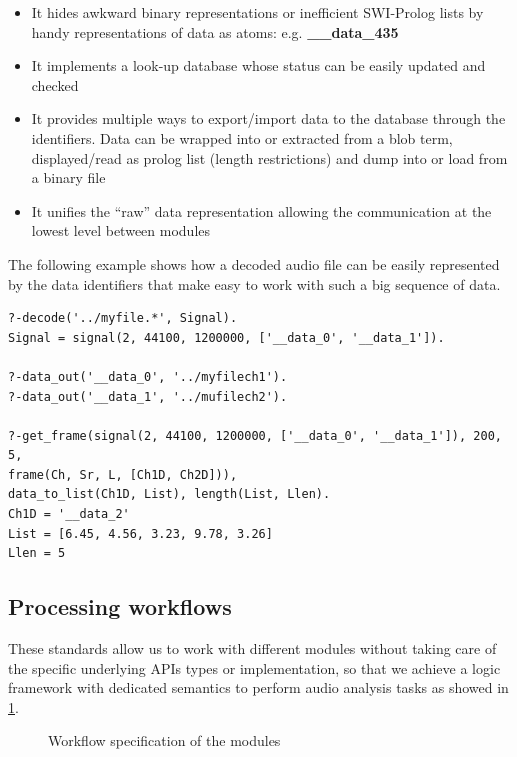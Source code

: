 \documentclass[runningheads]{llncs}
\begin{document}
\begin{itemize}
 \item It hides awkward binary representations or inefficient SWI-Prolog lists by handy representations of data as atoms: e.g. \textbf{\_\_data\_435}
 \item It implements a look-up database whose status can be easily updated and checked
 \item It provides multiple ways to export/import data to the database through the identifiers. Data can be wrapped into or extracted from a blob term, displayed/read as prolog list (length restrictions) and dump into or load from a binary file
 \item It unifies the ``raw'' data representation allowing the communication at the lowest level between modules 
\end{itemize}

The following example shows how a decoded audio file can be easily represented by the data identifiers that make easy to work with such a big sequence of data.
\begin{verbatim}
?-decode('../myfile.*', Signal).
Signal = signal(2, 44100, 1200000, ['__data_0', '__data_1']).

?-data_out('__data_0', '../myfilech1').
?-data_out('__data_1', '../mufilech2').

?-get_frame(signal(2, 44100, 1200000, ['__data_0', '__data_1']), 200, 5,
frame(Ch, Sr, L, [Ch1D, Ch2D])),
data_to_list(Ch1D, List), length(List, Llen).
Ch1D = '__data_2'
List = [6.45, 4.56, 3.23, 9.78, 3.26]
Llen = 5
\end{verbatim}

\subsection{Processing workflows}\label{subsec:worflow}

These standards allow us to work with different modules without taking care of the specific underlying APIs types or implementation, so that we achieve a logic framework with dedicated semantics to perform audio analysis tasks as showed in \ref{fig:workflow}.

\begin{figure}
\centerline{}
\caption{Workflow specification of the modules}
\label{fig:workflow}
\end{figure}
\end{document}
